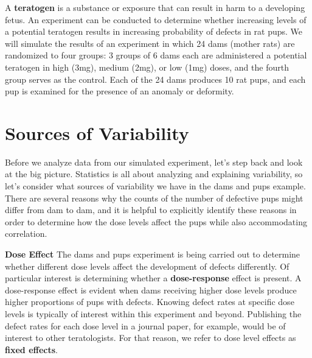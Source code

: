 \documentclass[
]{krantz}
\begin{document}
A \textbf{teratogen} is a substance or exposure that can result in harm to a developing fetus. An experiment can be conducted to determine whether increasing levels of a potential teratogen results in increasing probability of defects in rat pups. We will simulate the results of an experiment in which 24 dams (mother rats) are randomized to four groups: 3 groups of 6 dams each are administered a potential teratogen in high (3mg), medium (2mg), or low (1mg) doses, and the fourth group serves as the control. Each of the 24 dams produces 10 rat pups, and each pup is examined for the presence of an anomaly or deformity.

\hypertarget{sources-of-variability}{%
\section{Sources of Variability}\label{sources-of-variability}}

Before we analyze data from our simulated experiment, let's step back and look at the big picture. Statistics is all about analyzing and explaining variability, so let's consider what sources of variability we have in the dams and pups example. There are several reasons why the counts of the number of defective pups might differ from dam to dam, and it is helpful to explicitly identify these reasons in order to determine how the dose levels affect the pups while also accommodating correlation.

\textbf{Dose Effect} The dams and pups experiment is being carried out to determine whether different dose levels affect the development of defects differently. Of particular interest is determining whether a \textbf{dose-response}  effect is present. A dose-response effect is evident when dams receiving higher dose levels produce higher proportions of pups with defects. Knowing defect rates at specific dose levels is typically of interest within this experiment and beyond. Publishing the defect rates for each dose level in a journal paper, for example, would be of interest to other teratologists. For that reason, we refer to dose level effects as \textbf{fixed effects}. 
\end{document}
